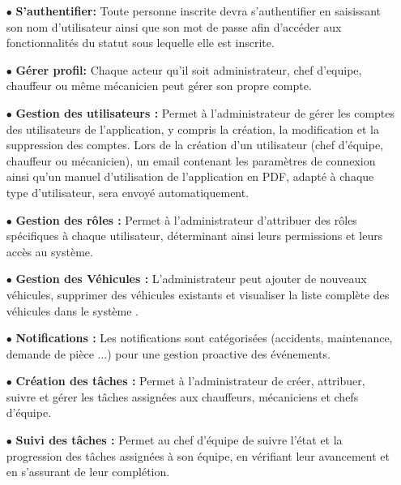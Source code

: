 \begin{itemize}


  \item[$\bullet$] \textbf {S’authentifier:} Toute personne inscrite devra s’authentifier en saisissant son nom d’utilisateur ainsi que son mot de passe afin d’accéder aux fonctionnalités du statut sous lequelle elle est inscrite.\\

  \item[$\bullet$] \textbf {Gérer profil:} Chaque acteur qu’il soit administrateur, chef d'equipe, chauffeur ou même mécanicien peut gérer son propre compte.\\

  \item[$\bullet$] \textbf {Gestion des utilisateurs :} Permet à l’administrateur de gérer les comptes des utilisateurs de l’application, y compris la création, la modification et la suppression des comptes. Lors de la création d'un utilisateur (chef d'équipe, chauffeur ou mécanicien), un email contenant les paramètres de connexion ainsi qu'un manuel d'utilisation de l'application en PDF, adapté à chaque type d'utilisateur, sera envoyé automatiquement.\\

  \item[$\bullet$] \textbf {Gestion des rôles :}  Permet à l'administrateur d'attribuer des rôles spécifiques à chaque utilisateur, déterminant ainsi leurs permissions et leurs accès au système.\\

  \item[$\bullet$] \textbf {Gestion des Véhicules :} L'administrateur peut ajouter de nouveaux véhicules, supprimer des véhicules existants et visualiser la liste complète des véhicules dans le système .\\

  \item[$\bullet$] \textbf {Notifications :} Les notifications sont catégorisées (accidents, maintenance, demande de pièce ...) pour une gestion proactive des événements.\\

  \item[$\bullet$] \textbf {Création des tâches :} Permet à l'administrateur de créer, attribuer, suivre et gérer les tâches assignées aux chauffeurs, mécaniciens et chefs d'équipe. \\

  \item[$\bullet$] \textbf {Suivi des tâches :} Permet au chef d'équipe de suivre l'état et la progression des tâches assignées à son équipe, en vérifiant leur avancement et en s'assurant de leur complétion.\\


\end{itemize}
